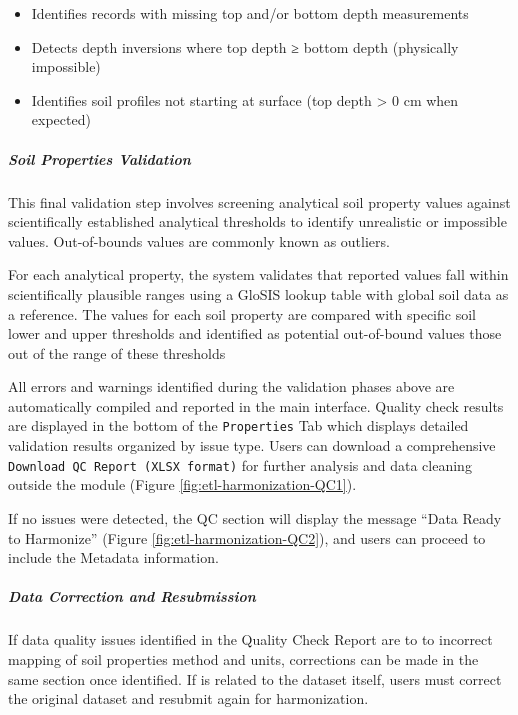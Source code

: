 \documentclass[
  10pt,
  b5paper,
  oneside]{book}
\providecommand{\tightlist}{%
  \setlength{\itemsep}{0pt}\setlength{\parskip}{0pt}}
\begin{document}
\begin{itemize}
\tightlist
\item
  Identifies records with missing top and/or bottom depth measurements
\item
  Detects depth inversions where top depth ≥ bottom depth (physically impossible)
\item
  Identifies soil profiles not starting at surface (top depth \textgreater{} 0 cm when expected)
\end{itemize}

\subparagraph*{Soil Properties Validation}\label{soil-properties-validation}

This final validation step involves screening analytical soil property values against scientifically established analytical thresholds to identify unrealistic or impossible values. Out-of-bounds values are commonly known as outliers.

For each analytical property, the system validates that reported values fall within scientifically plausible ranges using a GloSIS lookup table with global soil data as a reference. The values for each soil property are compared with specific soil lower and upper thresholds and identified as potential out-of-bound values those out of the range of these thresholds

All errors and warnings identified during the validation phases above are automatically compiled and reported in the main interface. Quality check results are displayed in the bottom of the \texttt{Properties} Tab which displays detailed validation results organized by issue type. Users can download a comprehensive \texttt{Download\ QC\ Report\ (XLSX\ format)} for further analysis and data cleaning outside the module (Figure \ref{fig:etl-harmonization-QC1}).

If no issues were detected, the QC section will display the message ``Data Ready to Harmonize'' (Figure \ref{fig:etl-harmonization-QC2}), and users can proceed to include the Metadata information.

\subparagraph*{Data Correction and Resubmission}\label{data-correction-and-resubmission}

If data quality issues identified in the Quality Check Report are to to incorrect mapping of soil properties method and units, corrections can be made in the same section once identified. If is related to the dataset itself, users must correct the original dataset and resubmit again for harmonization.
\end{document}
